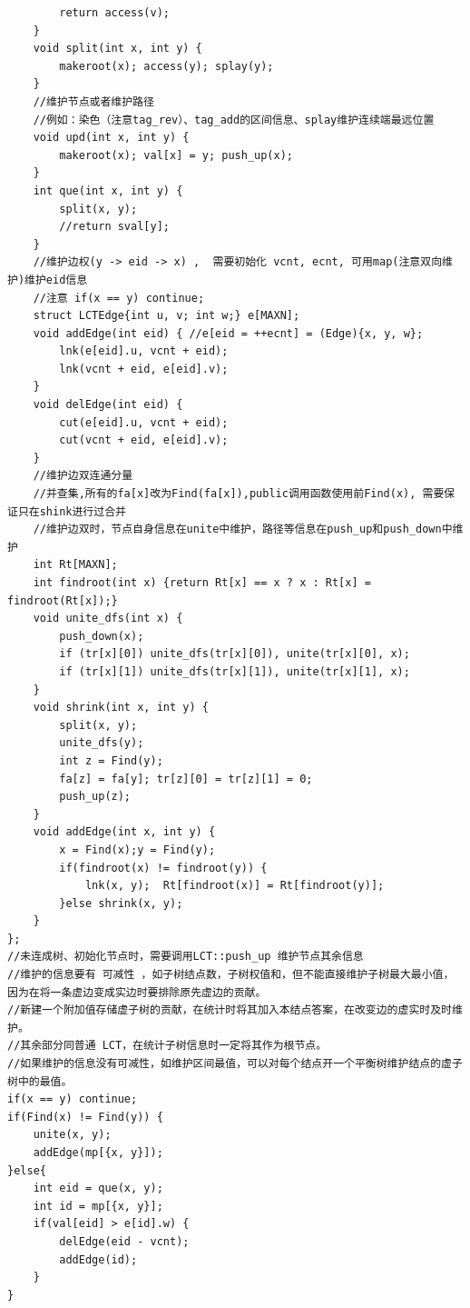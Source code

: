 \documentclass[10pt]{ctexart}
\begin{document}
{\begin{lstlisting}
        return access(v);
    }
    void split(int x, int y) {
        makeroot(x); access(y); splay(y);
    }
    //维护节点或者维护路径
    //例如：染色（注意tag_rev）、tag_add的区间信息、splay维护连续端最远位置
    void upd(int x, int y) {
        makeroot(x); val[x] = y; push_up(x);
    }
    int que(int x, int y) {
        split(x, y);
        //return sval[y];
    }
    //维护边权(y -> eid -> x) ,  需要初始化 vcnt, ecnt, 可用map(注意双向维护)维护eid信息
    //注意 if(x == y) continue;
    struct LCTEdge{int u, v; int w;} e[MAXN];
    void addEdge(int eid) { //e[eid = ++ecnt] = (Edge){x, y, w};
        lnk(e[eid].u, vcnt + eid); 
        lnk(vcnt + eid, e[eid].v);
    }
    void delEdge(int eid) {
        cut(e[eid].u, vcnt + eid); 
        cut(vcnt + eid, e[eid].v);
    }
    //维护边双连通分量
    //并查集,所有的fa[x]改为Find(fa[x]),public调用函数使用前Find(x), 需要保证只在shink进行过合并
    //维护边双时，节点自身信息在unite中维护，路径等信息在push_up和push_down中维护 
    int Rt[MAXN];
    int findroot(int x) {return Rt[x] == x ? x : Rt[x] = findroot(Rt[x]);} 
    void unite_dfs(int x) {
        push_down(x);
        if (tr[x][0]) unite_dfs(tr[x][0]), unite(tr[x][0], x);
        if (tr[x][1]) unite_dfs(tr[x][1]), unite(tr[x][1], x);
    }
    void shrink(int x, int y) {
        split(x, y);
        unite_dfs(y);
        int z = Find(y);
        fa[z] = fa[y]; tr[z][0] = tr[z][1] = 0;
        push_up(z);
    }
    void addEdge(int x, int y) {
        x = Find(x);y = Find(y);
        if(findroot(x) != findroot(y)) {
            lnk(x, y);  Rt[findroot(x)] = Rt[findroot(y)];
        }else shrink(x, y);
    }
};
//未连成树、初始化节点时，需要调用LCT::push_up 维护节点其余信息
//维护的信息要有 可减性 ，如子树结点数，子树权值和，但不能直接维护子树最大最小值，因为在将一条虚边变成实边时要排除原先虚边的贡献。
//新建一个附加值存储虚子树的贡献，在统计时将其加入本结点答案，在改变边的虚实时及时维护。
//其余部分同普通 LCT，在统计子树信息时一定将其作为根节点。
//如果维护的信息没有可减性，如维护区间最值，可以对每个结点开一个平衡树维护结点的虚子树中的最值。
if(x == y) continue;
if(Find(x) != Find(y)) {
    unite(x, y);
    addEdge(mp[{x, y}]);
}else{
    int eid = que(x, y);
    int id = mp[{x, y}];
    if(val[eid] > e[id].w) {
        delEdge(eid - vcnt);
        addEdge(id);
    }
}
\end{lstlisting}
}
\end{document}
